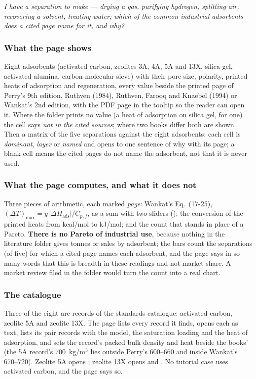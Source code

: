 \documentclass[11pt,a4paper]{article}
\begin{document}
\emph{I have a separation to make --- drying a gas, purifying hydrogen,
splitting air, recovering a solvent, treating water; which of the common
industrial adsorbents does a cited page name for it, and why?}

\subsubsection*{What the page shows}

Eight adsorbents (activated carbon, zeolites 3A, 4A, 5A and 13X, silica gel,
activated alumina, carbon molecular sieve) with their pore size, polarity,
printed heats of adsorption and regeneration, every value beside the printed
page of Perry's 9th edition, Ruthven (1984), Ruthven, Farooq and Knaebel (1994)
or Wankat's 2nd edition, with the PDF page in the tooltip so the reader can open
it.  Where the folder prints no value (a heat of adsorption on silica gel, for
one) the cell says \emph{not in the cited sources}; where two books differ both
are shown.  Then a matrix of the five separations against the eight adsorbents:
each cell is \emph{dominant}, \emph{layer} or \emph{named} and opens to one
sentence of why with its page; a blank cell means the cited pages do not name
the adsorbent, not that it is never used.

\subsubsection*{What the page computes, and what it does not}

Three pieces of arithmetic, each marked \emph{page}: Wankat's
Eq.~(17-25), $(\Delta T)_{\max} = y\,|\Delta H_{\mathrm{ads}}|/C_{p,f}$, as a
sum with two sliders (); the conversion of
the printed heats from kcal/mol to kJ/mol; and the count that stands in place of
a Pareto.  \textbf{There is no Pareto of industrial use}, because nothing in the
literature folder gives tonnes or sales by adsorbent; the bars count the
separations (of five) for which a cited page names each adsorbent, and the page
says in so many words that this is breadth in these readings and not market
share.  A market review filed in the folder would turn the count into a real
chart.

\subsubsection*{The catalogue}

Three of the eight are records of the standards catalogue: activated carbon,
zeolite 5A and zeolite 13X.  The page lists every  record it
finds, opens each as text, lists its pair records with the model, the saturation
loading and the heat of adsorption, and sets the record's packed bulk density and
heat beside the books' (the 5A record's 700~kg/m$^3$ lies outside Perry's
600--660 and inside Wankat's 670--720).  Zeolite 5A opens
; zeolite 13X opens  and
.  No tutorial case uses activated carbon, and
the page says so.
\end{document}

